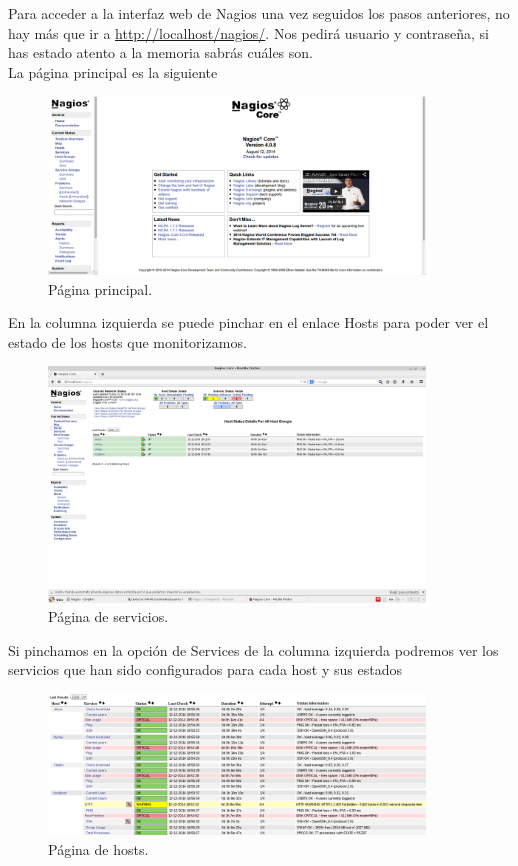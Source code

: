 \documentclass[11pt,a4paper]{article}
\begin{document}
Para acceder a la interfaz web de Nagios una vez seguidos los pasos anteriores, no hay más que ir a \url{http://localhost/nagios/}. Nos pedirá usuario y contraseña, si has estado atento a la memoria sabrás cuáles son.\\

La página principal es la siguiente

\begin{figure}[H]
  \centering
\includegraphics[width=10cm]{images/0.png} 
  \caption{Página principal.}
\end{figure}

En la columna izquierda se puede pinchar en el enlace Hosts para poder ver el estado de los hosts que monitorizamos.\\

\begin{figure}[H]
  \centering
\includegraphics[width=10cm]{images/2.png} 
  \caption{Página de servicios.}
\end{figure}

\newpage
Si pinchamos en la opción de Services de la columna izquierda podremos ver los servicios que han sido configurados para cada host y sus estados

\begin{figure}[H]
  \centering
\includegraphics[width=10cm]{images/8.png} 
  \caption{Página de hosts.}
\end{figure}
\end{document}
